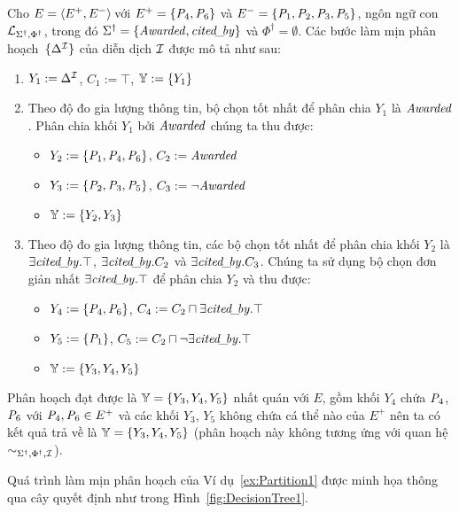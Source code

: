 \begin{Example}
Cho $E = \left\langle E^+, E^-\right\rangle\!$ với $E^+ = \{\mathit{P}_4, \mathit{P}_6\}$ và $E^- = \{\mathit{P}_1, \mathit{P}_2, \mathit{P}_3, \mathit{P}_5\}$, ngôn ngữ con $\mathcal{L}_{\Sigma^\dag,\Phi^\dag}$, trong đó $\Sigma^\dag = \{\mathit{Awarded}, \mathit{cited\!\_\!by}\}$ và  $\Phi^\dag = \emptyset$. Các bước làm mịn phân hoạch~$\{\Delta^{\mathcal{I}}\}$ của diễn dịch $\mathcal{I}$ được mô tả như sau:
\begin{enumerate}
	\item $Y_1 := \Delta^{\mathcal{I}}$, $C_1 := \top$, $\mathbb{Y} := \{Y_1\}$
	\item Theo độ đo gia lượng thông tin, bộ chọn tốt nhất để phân chia $Y_1$ là $\mathit{Awarded}$. Phân chia khối $Y_1$ bởi $\mathit{Awarded}$ chúng ta thu được:
	\begin{itemize}
		\item $Y_2 := \{\mathit{P}_1, \mathit{P}_4, \mathit{P}_6\}$, $C_2 := \mathit{Awarded}$
		\item $Y_3 := \{\mathit{P}_2, \mathit{P}_3, \mathit{P}_5\}$, $C_3 := \neg\mathit{Awarded}$
		\item $\mathbb{Y} := \{Y_2, Y_3\}$
	\end{itemize}
	\item Theo độ đo gia lượng thông tin, các bộ chọn tốt nhất để phân chia khối $Y_2$ là $\exists\mathit{cited\!\_\!by}.\top$, $\exists\mathit{cited\!\_\!by}.C_2$ và $\exists\mathit{cited\!\_\!by}.C_3$. Chúng ta sử dụng bộ chọn đơn giản nhất $\exists\mathit{cited\!\_\!by}.\top$ để phân chia $Y_2$ và thu được:
	\begin{itemize}
		\item $Y_4 := \{\mathit{P}_4, \mathit{P}_6\}$, $C_4 := C_2 \sqcap \exists\mathit{cited\!\_\!by}.\top$
		\item $Y_5 := \{\mathit{P}_1\}$, $C_5 := C_2 \sqcap \neg\exists\mathit{cited\!\_\!by}.\top$
		\item $\mathbb{Y} := \{Y_3, Y_4, Y_5\}$
	\end{itemize}
\end{enumerate}

Phân hoạch đạt được là $\mathbb{Y} = \{Y_3, Y_4, Y_5\}$ nhất quán với $E$, gồm khối $Y_4$ chứa $\mathit{P}_4$, $\mathit{P}_6$ với $\mathit{P}_4, \mathit{P}_6 \in E^+$ và các khối $Y_3$, $Y_5$ không chứa cá thể nào của $E^+$ nên ta có kết quả trả về là \mbox{$\mathbb{Y} = \{Y_3, Y_4, Y_5\}$}
(phân hoạch này không tương ứng với quan hệ $\sim_{\Sigma^\dag,\Phi^\dag,\mathcal{I}}$).\myend
\end{Example}

Quá trình làm mịn phân hoạch của Ví dụ~\ref{ex:Partition1} được minh họa thông qua cây quyết định như trong Hình~\ref{fig:DecisionTree1}.

